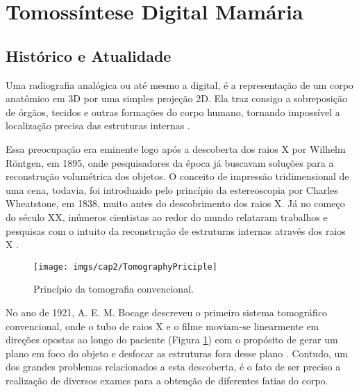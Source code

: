 \section{Tomossíntese Digital Mamária}     

\subsection{Histórico e Atualidade}

Uma radiografia analógica ou até mesmo a digital, é a representação de um corpo anatômico em \acs{3D} por uma simples projeção \acs{2D}. Ela traz consigo a sobreposição de órgãos, tecidos e outras formações do corpo humano, tornando impossível a localização precisa das estruturas internas \cite{levakhina2014three}. 

Essa preocupação era eminente logo após a descoberta dos raios X por Wilhelm Röntgen, em 1895, onde pesquisadores da época já buscavam soluções para a reconstrução volumétrica dos objetos. O conceito de impressão tridimensional de uma cena, todavia, foi introduzido pelo princípio da estereoscopia por Charles Wheatstone, em 1838, muito antes do descobrimento dos raios X. Já no começo do século XX, inúmeros cientistas ao redor do mundo relataram trabalhos e pesquisas com o intuito da reconstrução de estruturas internas através dos raios X \cite{dobbins2003digital,levakhina2014three}. 

\begin{figure}[htb]
	\caption{Princípio da tomografia convencional.}
	\begin{center}
		\texttt{[image: imgs/cap2/TomographyPriciple]}
	\end{center}
	\label{fig:imgCap2TomographyPriciple}
\end{figure}

No ano de 1921, A. E. M. Bocage descreveu o primeiro sistema tomográfico convencional, onde o tubo de raios X e o filme moviam-se linearmente em direções opostas ao longo do paciente (Figura \ref{fig:imgCap2TomographyPriciple}) com o propósito de gerar um plano em foco do objeto e desfocar as estruturas fora desse plano \cite{hsieh2009computed}. Contudo, um dos grandes problemas relacionados a esta descoberta, é o fato de ser preciso a realização de diversos exames para a obtenção de diferentes fatias do corpo. 

